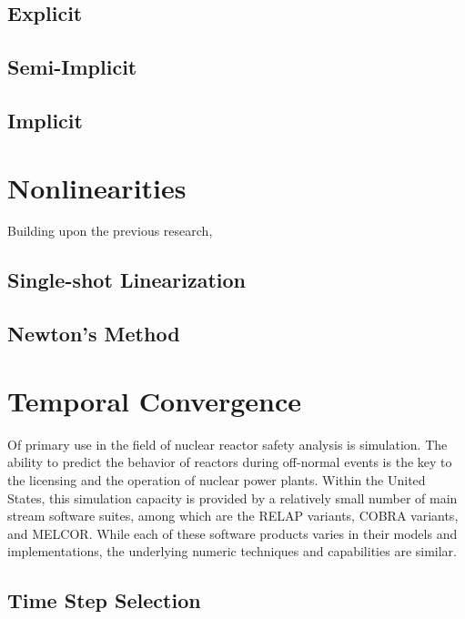 \subsection{Explicit}
\label{subsect:coupling_explicit}

\subsection{Semi-Implicit}
\label{subsect:coupling_semi_implicit}

\subsection{Implicit}
\label{subsect:coupling_implicit}

\section{Nonlinearities}
\label{sect:nonlinearities}
Building upon the previous research, 


\subsection{Single-shot Linearization}
\label{subsect:single_shot}

\subsection{Newton's Method}
\label{subsect:newtons_method}

\section{Temporal Convergence}
\label{sect:temporal_convergence}
Of primary use in the field of nuclear reactor safety analysis is simulation.
The ability to predict the behavior of reactors during off-normal events is the key to the licensing and the operation of nuclear power plants.
Within the United States, this simulation capacity is provided by a relatively small number of main stream software suites, among which are the RELAP variants, COBRA variants, and MELCOR.
While each of these software products varies in their models and implementations, the underlying numeric techniques and capabilities are similar.

\subsection{Time Step Selection}
\label{subsect:time_step_selection}

